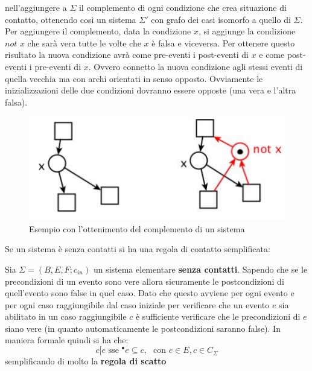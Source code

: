 \documentclass[a4paper,12pt, oneside]{book}
\begin{document}
nell'aggiungere a $\Sigma$ il complemento di ogni condizione che crea situazione
di contatto, ottenendo così un sistema $\Sigma'$ con grafo dei casi isomorfo a
quello di $\Sigma$.\\ 
Per aggiungere il complemento, data la condizione $x$, si aggiunge la condizione
$not\,\, x$ che sarà vera tutte le volte che $x$ è falsa e viceversa. Per
ottenere questo risultato la nuova condizione avrà come pre-eventi i
post-eventi di $x$ e come post-eventi i pre-eventi di $x$. Ovvero
connetto la nuova condizione agli stessi eventi di quella vecchia ma con archi
orientati in senso opposto. Ovviamente le inizializzazioni delle due condizioni
dovranno essere opposte (una vera e l'altra falsa).
\begin{figure}[H]
  \centering
  \includegraphics[scale = 0.6]{img/con2.jpg}
  \caption{Esempio con l'ottenimento del complemento di un sistema}
\end{figure}
Se un sistema è senza contatti si ha una regola di contatto semplificata:
\begin{definizione}
   Sia $\Sigma = (B,E,F;c_{in})$ un sistema elementare \textbf{senza
     contatti}. Sapendo che se le precondizioni di un evento sono vere allora
   sicuramente le postcondizioni di quell'evento sono false in quel caso. Dato
   che questo avviene per ogni evento e per ogni caso raggiungibile dal caso
   iniziale per verificare che un evento $e$ sia abilitato in un caso
   raggiungibile $c$ è sufficiente verificare che le precondizioni di $e$ siano
   vere (in quanto automaticamente le postcondizioni saranno false). In
   maniera formale quindi si ha che: 
   \[c[e\mbox{ sse } ^\bullet e\subseteq c,\,\,\mbox{ con } e\in E,c\in
     C_\Sigma\]
   semplificando di molto la \textbf{regola di scatto}
 \end{definizione}
\end{document}
